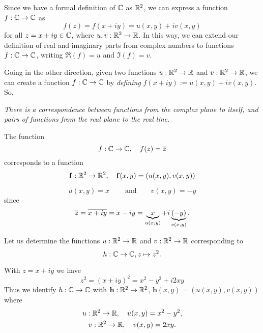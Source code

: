 Since we have a formal definition of $\mathbb{C}$ as $\mathbb{R}^2$, we can express a function $f : \mathbb{C} \to \mathbb{C}$ as
\begin{equation*}
f(z) = f(x+iy) = u(x,y) +i v(x,y)
\end{equation*}
for all $z =x+iy \in \mathbb{C}$, where $u, v : \mathbb{R}^2 \to \mathbb{R}$.  In this way, we can extend our definition of real and imaginary parts from complex numbers to functions $f:\mathbb{C} \to \mathbb{C}$, writing $\Re (f) = u$ and $\Im (f) = v$.




Going in the other direction, given two functions $u:\mathbb{R}^2 \to \mathbb{R}$ and $v:\mathbb{R}^2 \to \mathbb{R}$, we can create a function $f : \mathbb{C} \to \mathbb{C}$ by \emph{defining} $f(x+iy) := u(x,y) +iv(x,y)$.
So,
\begin{center}
\emph{
 There is a correspondence between functions from the complex plane to itself, and pairs of functions from the real plane to the real line.}
 \end{center}




\begin{example}
The function \[ f: \mathbb{C} \to \mathbb{C},\quad f(z) = \overline{z} \]
corresponds to a function
\[ \mathbf{f}: \mathbb{R}^2 \to \mathbb{R}^2, \quad \mathbf{f}(x,y) = \left( u(x,y), v(x,y) \right)
\]
\begin{blankbox}
\[
u(x,y) = x\ \qquad\text{and}\qquad v(x,y) = -y
\]
since
\[
\overline{z} = \overline{x+iy} = x-iy = \underbrace{x}_{u(x,y)} + i \underbrace{(-y)}_{v(x,y)}.
\]
\end{blankbox}
\end{example}



\begin{example}

Let us determine the functions $u:\mathbb{R}^2 \to \mathbb{R}$ and $v:\mathbb{R}^2 \to \mathbb{R}$ corresponding to
\begin{equation*}
h: \mathbb{C} \to \mathbb{C}, z \mapsto z^2.
\end{equation*}
\end{example}
\begin{solution}
With $z=x+iy$ we have
\[
z^2 = (x+iy)^2 = x^2-y^2+i2xy
\]
Thus we identify $h:\mathbb{C} \to \mathbb{C}$ with $\mathbf{h}:\mathbb{R}^2 \to \mathbb{R}^2$, $\mathbf{h}(x,y) = (u(x,y), v(x,y))$  where
\begin{gather*}
u: \mathbb{R}^2 \to \mathbb{R}, \quad u(x,y) = x^2-y^2, \\
v: \mathbb{R}^2 \to \mathbb{R}, \quad v(x,y) = 2xy.
\end{gather*}

\end{solution}

